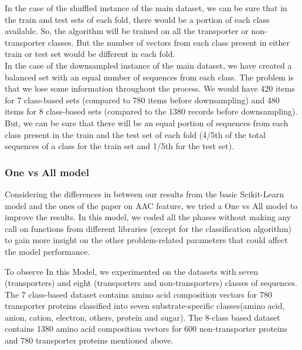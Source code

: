     In the case of the shuffled instance of the main dataset, we can be sure that in the train and test sets of 
    each fold, there would be a portion of each class available. So, the algorithm will be trained on all the 
    transporter or non-transporter classes. But the number of vectors from each class present in either train or 
    test set would be different in each fold.\\

    In the case of the downsampled instance of the main dataset, we have created a balanced set with an equal number of 
    sequences from each class. The problem is that we lose some information throughout the process. We would have 420 items 
    for 7 class-based sets (compared to 780 items before downsampling) and 480 items for 8 class-based sets 
    (compared to the 1380 records before downsampling). But, we can be sure that there will be an equal portion of sequences 
    from each class present in the train and the test set of each fold (4/5th of the total sequences of a class 
    for the train set and 1/5th for the test set).\\

    
    

    \subsubsection{One vs All model}
    Considering the differences in between our results from the basic Scikit-Learn model and the ones of 
    the paper on AAC feature, we tried a One vs All model to improve the results. In this model, we coded all 
    the phases without making any call on functions from different libraries (except for the classification algorithm) 
    to gain more insight on the other problem-related parameters that could affect the model performance.\\

    
    To observe In this Model, we experimented on the datasets with seven (transporters) and eight 
    (transporters and non-transporters) classes of sequences. The 7 class-based dataset contains 
    amino acid composition vectors for 780 transporter proteins classified into seven substrate-specific 
    classes(amino acid, anion, cation, electron, others, protein and sugar). The 8-class based dataset 
    contains 1380 amino acid composition vectors for 600 non-transporter proteins and 780 transporter 
    proteins mentioned above.\\

